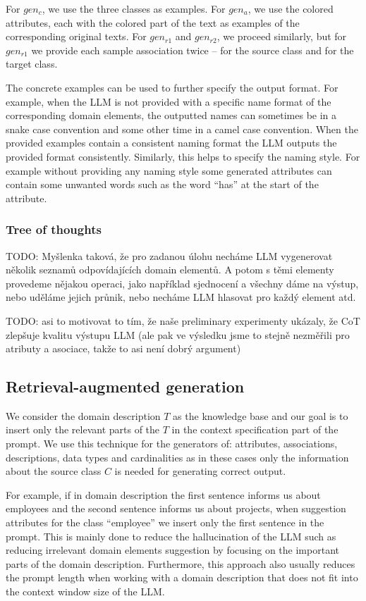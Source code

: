 For $gen_c$, we use the three classes as examples. For $gen_a$, we use the colored attributes, each with the colored part of the text as examples of the corresponding original texts. For $gen_{r1}$ and ${gen_{r2}}$, we proceed similarly, but for ${gen_{r1}}$ we provide each sample association twice – for the source class and for the target class.

The concrete examples can be used to further specify the output format. For example,  when the LLM is not provided with a specific name format of the corresponding domain elements, the outputted names can sometimes be in a snake case convention and some other time in a camel case convention. When the provided examples contain a consistent naming format the LLM outputs the provided format consistently. Similarly, this helps to specify the naming style. For example without providing any naming style some generated attributes can contain some unwanted words such as the word ``has'' at the start of the attribute.


\subsubsection{Tree of thoughts}

TODO: Myšlenka taková, že pro zadanou úlohu necháme LLM vygenerovat několik seznamů odpovídajících domain elementů. A potom s těmi elementy provedeme nějakou operaci, jako například sjednocení a všechny dáme na výstup, nebo uděláme jejich průnik, nebo necháme LLM hlasovat pro každý element atd.

TODO: asi to motivovat to tím, že naše preliminary experimenty ukázaly, že CoT zlepšuje kvalitu výstupu LLM (ale pak ve výsledku jsme to stejně nezměřili pro atributy a asociace, takže to asi není dobrý argument)


\subsection{Retrieval-augmented generation}

We consider the domain description $T$ as the knowledge base and our goal is to insert only the relevant parts of the $T$ in the context specification part of the prompt. We use this technique for the generators of: attributes, associations, descriptions, data types and cardinalities as in these cases only the information about the source class $C$ is needed for generating correct output.

For example, if in domain description the first sentence informs us about employees and the second sentence informs us about projects, when suggestion attributes for the class ``employee'' we insert only the first sentence in the prompt. This is mainly done to reduce the hallucination of the LLM such as reducing irrelevant domain elements suggestion by focusing on the important parts of the domain description. Furthermore, this approach also usually reduces the prompt length when working with a domain description that does not fit into the context window size of the LLM. \\

